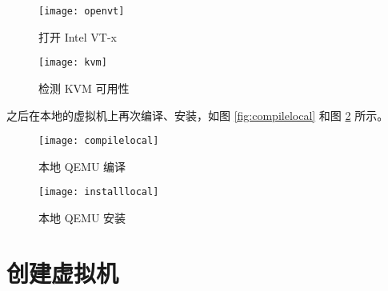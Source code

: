     \begin{figure}[h]
        \centering
        \begin{minipage}{0.48\textwidth}
            \centering
            \texttt{[image: openvt]}
            \caption{打开 Intel VT-x}\label{fig:openvt}
        \end{minipage}
        \begin{minipage}{0.48\textwidth}
            \centering
            \texttt{[image: kvm]}
            \caption{检测 KVM 可用性}\label{fig:kvm}
        \end{minipage}
    \end{figure}

    之后在本地的虚拟机上再次编译、安装，如图 \ref{fig:compilelocal} 和图 \ref{fig:installlocal} 所示。

    \begin{figure}[h]
        \centering
        \begin{minipage}{0.48\textwidth}
            \centering
            \texttt{[image: compilelocal]}
            \caption{本地 QEMU 编译}\label{fig:compilelocal}
        \end{minipage}
        \begin{minipage}{0.48\textwidth}
            \texttt{[image: installlocal]}
            \caption{本地 QEMU 安装}\label{fig:installlocal}
        \end{minipage}
    \end{figure}

    \section{创建虚拟机}
    

    
